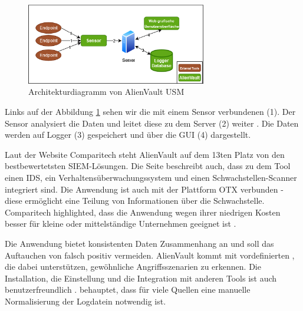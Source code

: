\begin{figure}[H]
   \centering
   \includegraphics[width=0.7\textwidth]{assets/AlienVault.drawio.png}
   \caption[Architekturdiagramm von AlienVault \gls{USM}]
   {Architekturdiagramm von AlienVault \gls{USM}}
   \label{fig:AlienVault_Architektur}
   \centering
\end{figure}



Links auf der Abbildung \ref{fig:AlienVault_Architektur} sehen wir die mit einem Sensor verbundenen  (1). Der Sensor analysiert die Daten und leitet diese zu dem Server (2) weiter \citep{AV_Sensor}. Die Daten werden auf Logger (3) gespeichert und über die \gls{GUI} (4) dargestellt.

Laut der Website Comparitech steht AlienVault auf dem 13ten Platz von den bestbewertetsten \gls{SIEM}-Lösungen. Die Seite beschreibt auch, dass zu dem Tool einen \gls{IDS}, ein Verhaltensüberwachungssystem und einen Schwachstellen-Scanner integriert sind. Die Anwendung ist auch mit der Plattform \gls{OTX} verbunden - diese ermöglicht eine Teilung von Informationen über die Schwachstelle. Comparitech highlighted, dass die Anwendung wegen ihrer niedrigen Kosten besser für kleine oder mittelständige Unternehmen geeignet ist \citep{comparitech_SIEM}.

Die Anwendung bietet konsistenten Daten Zusammenhang an und soll das Auftauchen von \gls{falsch positiv} vermeiden. AlienVault kommt mit vordefinierten , die dabei unterstützen, gewöhnliche Angriffsszenarien zu erkennen. Die Installation, die Einstellung und die Integration mit anderen Tools ist auch benutzerfreundlich \citep{Gomes_AV}. \citep{Nabil_AV} behauptet, dass für viele Quellen eine manuelle Normalisierung der Logdatein notwendig ist.

